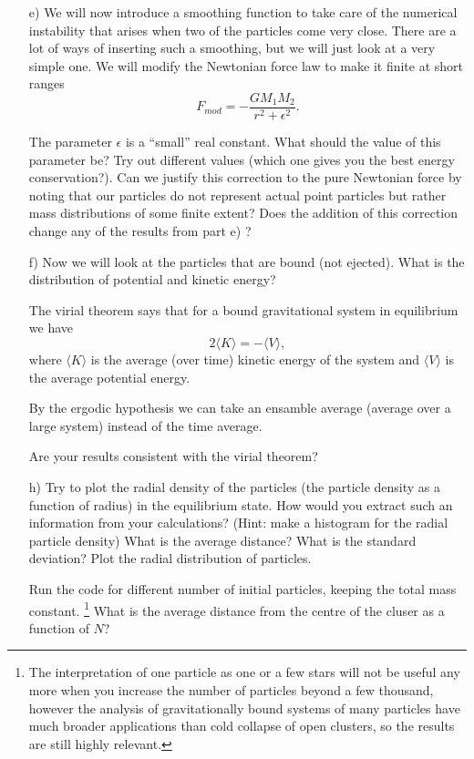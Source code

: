 \documentclass[11pt,a4wide]{article}
\begin{document}
\begin{enumerate}
\item[e)] We will now introduce a smoothing function to take care of
  the numerical instability that arises when two of the particles come
  very close. There are a lot of ways of inserting such a smoothing, but
  we will just look at a very simple one. We will modify the Newtonian
  force law to make it finite at short ranges
\[ F_{mod} = -\frac{GM_1M_2}{r^2 + \epsilon^2}.\]

The parameter $\epsilon$ is a ``small'' real constant. What should the value of this parameter be? Try out different values (which one gives you the best energy conservation?). Can we justify this correction to the pure Newtonian force by noting that our particles do not represent actual point particles
but rather mass distributions of some finite extent? Does the addition
of this correction change any of the results from part e) ?


\item[f)] Now we will look at the particles that are bound (not
  ejected). What is the distribution of potential and kinetic energy?

The virial theorem says that for a bound gravitational system in
equilibrium we have
\[
2\langle K\rangle = -\langle V \rangle,
\] 
where $\langle K\rangle$
is the average (over time) kinetic energy of the system and $ \langle V
\rangle$ is the average potential energy. 

By the ergodic hypothesis we can take an ensamble average (average over a large system) instead of the time average. 

Are your results consistent with the virial theorem? 

\item[h)]  Try to plot the radial density of the particles (the particle density as a function of radius) in the
  equilibrium state. How would you extract such an information from your calculations? (Hint: make a histogram for the radial
particle density) What is the average distance? What is the
  standard deviation? Plot the radial distribution of particles.

Run the code for different number of initial particles, keeping the
total mass constant. \footnote{The interpretation of one particle as one or a few stars will not be useful any more when you increase the number of particles beyond a few thousand, however the analysis of gravitationally bound systems of many particles have much broader applications than cold collapse of open clusters, so the results are still highly relevant.} What is the average distance from the centre of the cluser as a function of $N$?


\end{enumerate}
\end{document}
